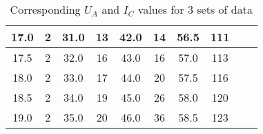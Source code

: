 \begin{table*}
\begin{ruledtabular}
\begin{tabular}{|cccccccccc|}
        \multicolumn{1}{|c|}{17.0}      & \multicolumn{1}{c|}{2}          & \multicolumn{1}{c|}{31.0}      & \multicolumn{1}{c|}{13}         & \multicolumn{1}{c|}{42.0}      & \multicolumn{1}{c|}{14}         & \multicolumn{1}{c|}{56.5}      & \multicolumn{1}{c|}{111}        & \multicolumn{1}{c|}{}          &            \\ \hline
        \multicolumn{1}{|c|}{17.5}      & \multicolumn{1}{c|}{2}          & \multicolumn{1}{c|}{32.0}      & \multicolumn{1}{c|}{16}         & \multicolumn{1}{c|}{43.0}      & \multicolumn{1}{c|}{16}         & \multicolumn{1}{c|}{57.0}      & \multicolumn{1}{c|}{113}        & \multicolumn{1}{c|}{}          &            \\ \hline
        \multicolumn{1}{|c|}{18.0}      & \multicolumn{1}{c|}{2}          & \multicolumn{1}{c|}{33.0}      & \multicolumn{1}{c|}{17}         & \multicolumn{1}{c|}{44.0}      & \multicolumn{1}{c|}{20}         & \multicolumn{1}{c|}{57.5}      & \multicolumn{1}{c|}{116}        & \multicolumn{1}{c|}{}          &            \\ \hline
        \multicolumn{1}{|c|}{18.5}      & \multicolumn{1}{c|}{2}          & \multicolumn{1}{c|}{34.0}      & \multicolumn{1}{c|}{19}         & \multicolumn{1}{c|}{45.0}      & \multicolumn{1}{c|}{26}         & \multicolumn{1}{c|}{58.0}      & \multicolumn{1}{c|}{120}        & \multicolumn{1}{c|}{}          &            \\ \hline
        \multicolumn{1}{|c|}{19.0}      & \multicolumn{1}{c|}{2}          & \multicolumn{1}{c|}{35.0}      & \multicolumn{1}{c|}{20}         & \multicolumn{1}{c|}{46.0}      & \multicolumn{1}{c|}{36}         & \multicolumn{1}{c|}{58.5}      & \multicolumn{1}{c|}{123}        & \multicolumn{1}{c|}{}          &            \\          
    \end{tabular}
    \caption{Corresponding $U_A$ and $I_C$ values for 3 sets of data}
    \label{tab}
\end{ruledtabular}
\end{table*}